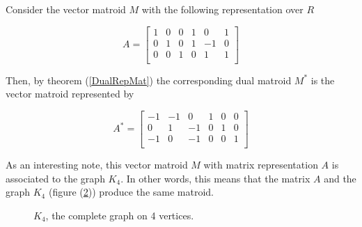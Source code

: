 \begin{exmp}
    Consider the vector matroid $M$ with the following representation over $R$
    \begin{figure}[H]
        $$A = \begin{bmatrix}
            1 & 0 & 0 & 1 & 0 & 1 \\
            0 & 1 & 0 & 1 & -1 & 0 \\
            0 & 0 & 1 & 0 & 1 & 1 \\
        \end{bmatrix}$$
        \label{MatOfK4}
    \end{figure}
Then, by theorem (\ref{DualRepMat}) the corresponding dual matroid $M^*$ is the vector matroid represented by 
    \begin{figure}[H]
        $$A^* = \begin{bmatrix}
            -1 & -1 & 0 & 1 & 0 & 0 \\
            0 & 1 & -1 & 0 & 1 & 0 \\
            -1 & 0 & -1 & 0 & 0 & 1 \\
        \end{bmatrix}$$
    \end{figure}
As an interesting note, this vector matroid $M$ with matrix representation $A$ is associated to the graph $K_4$. In other words, this means that the matrix $A$ and the graph $K_4$ (figure (\ref{K4Graph})) produce the same matroid.

       \begin{figure}[H]
        \centering
            \caption{$K_4$, the complete graph on 4 vertices.}
            \label{K4Graph}
        \end{figure}


\end{exmp}
